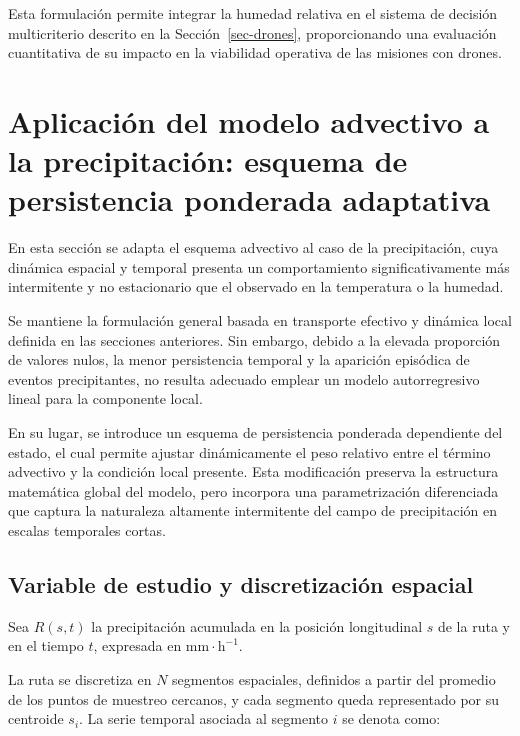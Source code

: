 \documentclass[
  spanish,
  us-letterpaper,
]{scrreprt}
\numberwithin{equation}{section}
\begin{document}
Esta formulación permite integrar la humedad relativa en el sistema de
decisión multicriterio descrito en la Sección~\ref{sec-drones},
proporcionando una evaluación cuantitativa de su impacto en la
viabilidad operativa de las misiones con drones.

\section{Aplicación del modelo advectivo a la precipitación: esquema de
persistencia ponderada
adaptativa}\label{aplicaciuxf3n-del-modelo-advectivo-a-la-precipitaciuxf3n-esquema-de-persistencia-ponderada-adaptativa}

En esta sección se adapta el esquema advectivo al caso de la
precipitación, cuya dinámica espacial y temporal presenta un
comportamiento significativamente más intermitente y no estacionario que
el observado en la temperatura o la humedad.

Se mantiene la formulación general basada en transporte efectivo y
dinámica local definida en las secciones anteriores. Sin embargo, debido
a la elevada proporción de valores nulos, la menor persistencia temporal
y la aparición episódica de eventos precipitantes, no resulta adecuado
emplear un modelo autorregresivo lineal para la componente local.

En su lugar, se introduce un esquema de persistencia ponderada
dependiente del estado, el cual permite ajustar dinámicamente el peso
relativo entre el término advectivo y la condición local presente. Esta
modificación preserva la estructura matemática global del modelo, pero
incorpora una parametrización diferenciada que captura la naturaleza
altamente intermitente del campo de precipitación en escalas temporales
cortas.

\subsection{Variable de estudio y discretización
espacial}\label{variable-de-estudio-y-discretizaciuxf3n-espacial-2}

Sea \(R(s,t)\) la precipitación acumulada en la posición longitudinal
\(s\) de la ruta y en el tiempo \(t\), expresada en
\(\mathrm{mm \cdot h^{-1}}\).

La ruta se discretiza en \(N\) segmentos espaciales, definidos a partir
del promedio de los puntos de muestreo cercanos, y cada segmento queda
representado por su centroide \(s_i\). La serie temporal asociada al
segmento \(i\) se denota como:
\end{document}
